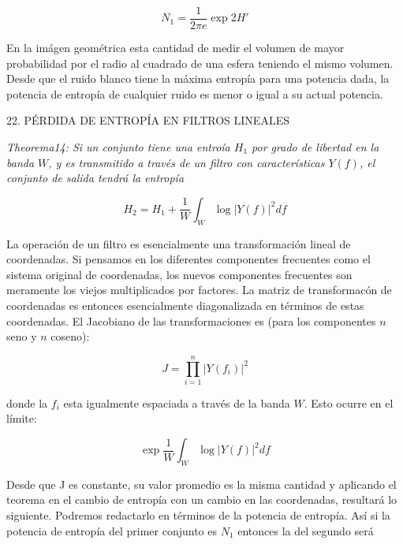 \begin{equation}
N_{1}=\frac{1}{2\pi e}\exp 2{H}'
\end{equation}

En la im\'agen geom\'etrica esta cantidad de medir el volumen de mayor probabilidad por el radio al cuadrado de una esfera teniendo el mismo volumen. Desde que el ruido blanco tiene la m\'axima entrop\'ia para una potencia dada, la potencia de entrop\'ia de cualquier ruido es menor o igual a su actual potencia.\newline \newline

22. P\'ERDIDA DE ENTROP\'IA EN FILTROS LINEALES

\textit{Theorema14: Si un conjunto tiene una entro\'ia $H_{1}$ por grado de libertad en la banda $W$, y es transmitido a trav\'es de un filtro con caracter\'isticas $Y\left ( f \right )$, el conjunto de salida tendr\'a la entrop\'ia} 

\begin{equation}
H_{2}=H_{1}+\frac{1}{W}\int_{W}^{\:}\log \left | Y\left ( f \right ) \right |^{2}df
\end{equation}

La operaci\'on de un filtro es esencialmente una transformaci\'on lineal de coordenadas. Si pensamos en los diferentes componentes frecuentes como el sistema original de coordenadas, los nuevos componentes frecuentes son meramente los viejos multiplicados por factores. La matriz de transformac\'on de coordenadas es entonces esencialmente diagonalizada en t\'erminos de estas coordenadas. El Jacobiano de las transformaciones es (para los componentes $n$ seno y $n$ coseno):

\begin{equation}
J=\prod_{i=1}^{n}\left | Y\left ( f_{i} \right )  \right |^{2}
\end{equation}

donde la $f_{i}$ esta igualmente espaciada a trav\'es de la banda $W$. Esto ocurre en el l\'imite:

\begin{equation}
\exp \frac{1}{W}\int_{W}^{\:}\log \left | Y\left ( f \right ) \right |^{2}df
\end{equation}

Desde que J es constante, su valor promedio es la misma cantidad y aplicando el teorema en el cambio de entrop\'ia con un cambio en las coordenadas, resultar\'a lo siguiente. Podremos redactarlo en t\'erminos de la potencia de entrop\'ia. As\'i si la potencia de entrop\'ia del primer conjunto es $N_{1}$ entonces la del segundo ser\'a

